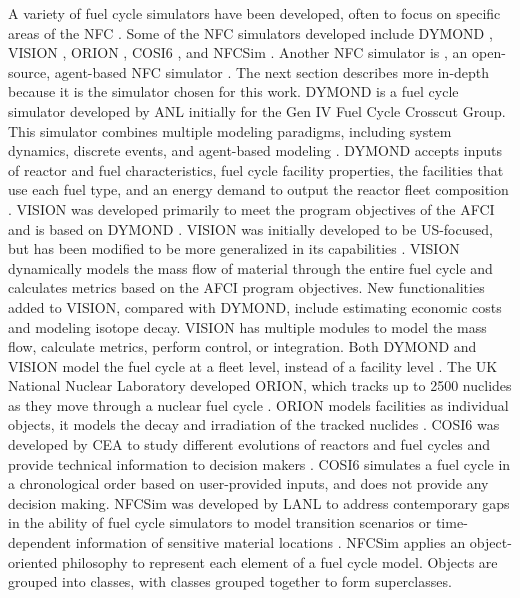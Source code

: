 A variety of fuel cycle simulators have been developed, often to focus on 
specific areas of the \gls{NFC} \cite{huff_next_2010}. Some of the 
\gls{NFC} simulators developed include
\gls{DYMOND} \cite{feng_sensitivity_2020,feng_standardized_2016}, 
\gls{VISION} \cite{yacout_visionverifiable_2006}, ORION 
\cite{gregg_analysis_2012}, COSI6 \cite{coquelet-pascal_cosi6:_2015}, and
\gls{NFCSim} \cite{schneider_nfcsim:_2005}. 
Another \gls{NFC} simulator is \Cyclus, an open-source, agent-based 
\gls{NFC} simulator \cite{huff_fundamental_2016}. The next section 
describes \Cyclus more in-depth because it is the simulator chosen for this 
work. 
\gls{DYMOND} is a fuel cycle simulator developed by \gls{ANL} initially for 
the Gen IV Fuel Cycle Crosscut Group. This simulator combines 
multiple modeling paradigms, including system dynamics, discrete events, and
agent-based modeling \cite{feng_standardized_2016,feng_sensitivity_2020}.
\gls{DYMOND} accepts inputs of reactor and fuel characteristics, fuel cycle 
facility properties, the facilities that use each fuel type, and an 
energy demand to output the reactor fleet composition \cite{feng_standardized_2016}.
\gls{VISION} was developed primarily to meet the program objectives of the 
\gls{AFCI} and is based on \gls{DYMOND} \cite{yacout_visionverifiable_2006}.
\gls{VISION} was initially developed to be US-focused, but has been modified to 
be more generalized in its capabilities \cite{feng_standardized_2016}.
\gls{VISION} dynamically models the mass flow of material through the 
entire fuel cycle and calculates metrics based on the \gls{AFCI} program 
objectives. New functionalities added to \gls{VISION}, compared with \gls{DYMOND}, 
include estimating economic costs and modeling isotope decay. 
\gls{VISION} has multiple 
modules to model the mass flow, calculate metrics, perform control, or 
integration. 
Both \gls{DYMOND} and \gls{VISION} model the fuel cycle at a fleet level, 
instead of a facility level \cite{feng_standardized_2016}.  
The UK National Nuclear Laboratory developed ORION, which tracks up to 
2500 nuclides as they 
move through a nuclear fuel cycle \cite{gregg_analysis_2012}. ORION models
facilities as individual objects, it models
the decay and irradiation of the tracked nuclides 
\cite{feng_standardized_2016}. COSI6 was developed by \gls{CEA} to 
study different evolutions of reactors and fuel cycles and 
provide technical information to decision makers \cite{coquelet-pascal_cosi6:_2015}. 
COSI6 simulates a fuel 
cycle in a chronological order based on user-provided inputs, and does 
not provide any decision making. \gls{NFCSim} was developed by \gls{LANL}
to address contemporary gaps in the ability of fuel cycle simulators 
to model transition scenarios or time-dependent information of 
sensitive material locations \cite{schneider_nfcsim:_2005}. 
\gls{NFCSim} applies an object-oriented 
philosophy to represent each element of a fuel cycle model. Objects 
are grouped into classes, with classes grouped together to form 
superclasses. 

